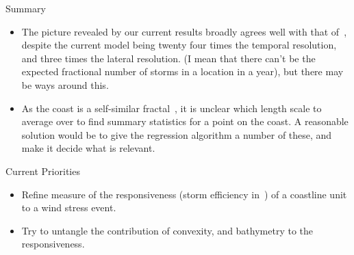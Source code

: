 \begin{frame}{Summary}
\begin{itemize}
\item The picture revealed by our current results broadly agrees well with that
      of~\cite{ZannaPreprint}, despite the current model being twenty four times
      the temporal resolution, and three times the lateral resolution.
       (I mean that there can't be the expected fractional number of storms
        in a location in a year), but there may be ways around this.
\item As the coast is a self-similar fractal~\cite{mandelbrot1967long, richardson1961problem},
      it is unclear which length scale to average over to find summary statistics
      for a point on the coast. A reasonable solution would be to give the
      regression algorithm a number of these, and make it decide what is relevant.
\end{itemize}

\end{frame}

\begin{frame}{Current Priorities}
\begin{itemize}
\item Refine measure of the responsiveness  (storm efficiency in~\cite{ZannaPreprint})
      of a coastline unit to a wind stress event.
\item Try to untangle the contribution of
	    convexity, and bathymetry to the responsiveness.
\end{itemize}
\end{frame}

